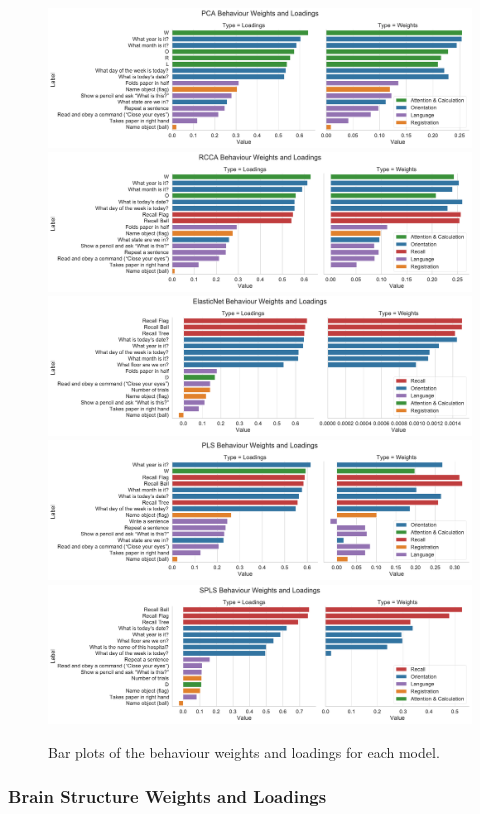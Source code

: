 \begin{figure}
\centering
\includegraphics[width=0.8\linewidth]{figures/adni/PCA behaviour weights and loadings}
\includegraphics[width=0.8\linewidth]{figures/adni/RCCA behaviour weights and loadings}
\includegraphics[width=0.8\linewidth]{figures/adni/ElasticNet behaviour weights and loadings}
\includegraphics[width=0.8\linewidth]{figures/adni/PLS behaviour weights and loadings}
\includegraphics[width=0.8\linewidth]{figures/adni/SPLS behaviour weights and loadings}
\caption{Bar plots of the behaviour weights and loadings for each model.}
\end{figure}

\subsubsection{Brain Structure Weights and Loadings}

